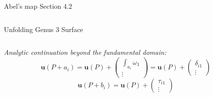 \documentclass[11pt,aspectratio=169]{beamer}
\begin{document}
\begin{frame}[noframenumbering]{Abel's map}{\tiny \cite{Ber06} Section 4.2}
\begin{columns}
\begin{column}{0.45\textwidth}
            \tiny Unfolding Genus 3 Surface
        \end{column}
    \end{columns}

    \emph{Analytic continuation beyond the fundamental domain:}
    \[\mathbf{u}(P+a_i) = \mathbf{u}(P) + \begin{pmatrix} \int_{a_i} \omega_1 \\ \vdots \end{pmatrix} = \mathbf{u}(P) + \begin{pmatrix} \delta_{i1} \\ \vdots \end{pmatrix}\]
    \[\mathbf{u}(P+b_i) = \mathbf{u}(P) + \begin{pmatrix} \tau_{i1} \\ \vdots \end{pmatrix}\]
\end{frame}
\end{document}
